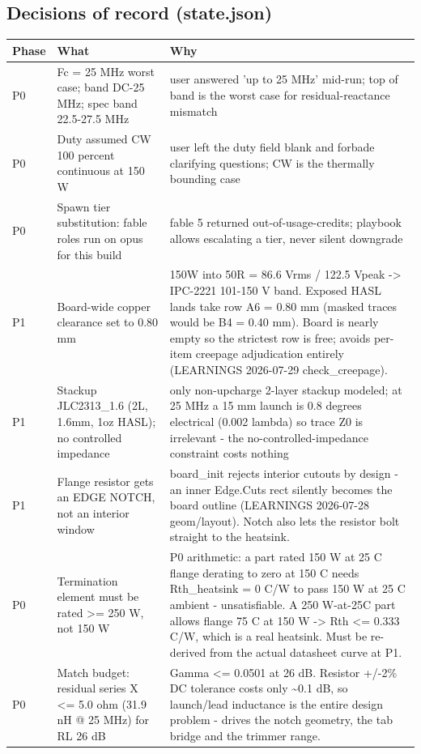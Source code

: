 \documentclass[11pt,a4paper]{article}
\begin{document}
\subsection*{Decisions of record (state.json)}
{\small
\begin{longtable}{lp{5.2cm}p{7.2cm}}
\toprule
\textbf{Phase} & \textbf{What} & \textbf{Why} \\
\midrule
\endhead
P0 & Fc = 25 MHz worst case; band DC-25 MHz; spec band 22.5-27.5 MHz & user answered 'up to 25 MHz' mid-run; top of band is the worst case for residual-reactance mismatch \\
P0 & Duty assumed CW 100 percent continuous at 150 W & user left the duty field blank and forbade clarifying questions; CW is the thermally bounding case \\
P0 & Spawn tier substitution: fable roles run on opus for this build & fable 5 returned out-of-usage-credits; playbook allows escalating a tier, never silent downgrade \\
P1 & Board-wide copper clearance set to 0.80 mm & 150W into 50R = 86.6 Vrms / 122.5 Vpeak -\textgreater{} IPC-2221 101-150 V band. Exposed HASL lands take row A6 = 0.80 mm (masked traces would be B4 = 0.40 mm). Board is nearly empty so the strictest row is free; avoids per-item creepage adjudication entirely (LEARNINGS 2026-07-29 check\_creepage). \\
P1 & Stackup JLC2313\_1.6 (2L, 1.6mm, 1oz HASL); no controlled impedance & only non-upcharge 2-layer stackup modeled; at 25 MHz a 15 mm launch is 0.8 degrees electrical (0.002 lambda) so trace Z0 is irrelevant - the no-controlled-impedance constraint costs nothing \\
P1 & Flange resistor gets an EDGE NOTCH, not an interior window & board\_init rejects interior cutouts by design - an inner Edge.Cuts rect silently becomes the board outline (LEARNINGS 2026-07-28 geom/layout). Notch also lets the resistor bolt straight to the heatsink. \\
P0 & Termination element must be rated \textgreater{}= 250 W, not 150 W & P0 arithmetic: a part rated 150 W at 25 C flange derating to zero at 150 C needs Rth\_heatsink = 0 C/W to pass 150 W at 25 C ambient - unsatisfiable. A 250 W-at-25C part allows flange 75 C at 150 W -\textgreater{} Rth \textless{}= 0.333 C/W, which is a real heatsink. Must be re-derived from the actual datasheet curve at P1. \\
P0 & Match budget: residual series X \textless{}= 5.0 ohm (31.9 nH @ 25 MHz) for RL 26 dB & \textbar{}Gamma\textbar{} \textless{}= 0.0501 at 26 dB. Resistor +/-2\% DC tolerance costs only \textasciitilde{}0.1 dB, so launch/lead inductance is the entire design problem - drives the notch geometry, the tab bridge and the trimmer range. \\

\end{longtable}}
\end{document}
